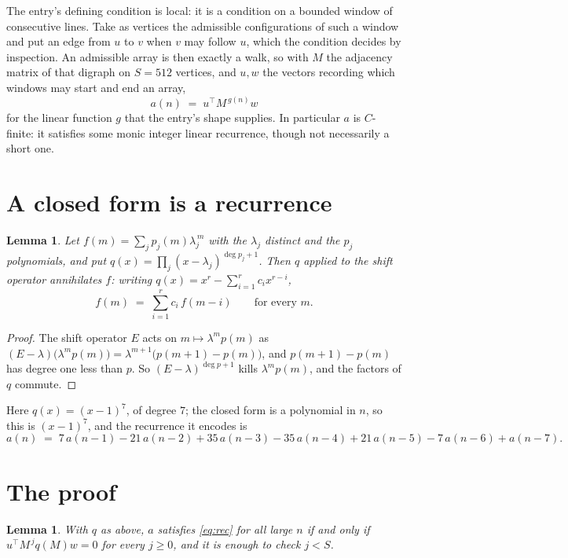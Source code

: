\documentclass[11pt,a4paper]{article}
\theoremstyle{plain}
\newtheorem{lemma}[theorem]{Lemma}
\theoremstyle{definition}
\begin{document}
The entry's defining condition is local: it is a condition on a bounded window of consecutive lines. Take as vertices the
admissible configurations of such a window and put an edge from $u$ to $v$ when $v$ may
follow $u$, which the condition decides by inspection. An admissible array is then exactly a
walk, so with $M$ the adjacency matrix of that digraph on $S=512$ vertices, and $u,w$ the
vectors recording which windows may start and end an array,
\[
a(n)\;=\;u^{\!\top}M^{\,g(n)}w
\]
for the linear function $g$ that the entry's shape supplies. In particular $a$ is
$C$-finite: it satisfies some monic integer linear recurrence, though not necessarily a short
one.

\section{A closed form is a recurrence}

\begin{lemma}\label{lem:ann}
Let $f(m)=\sum_{j}p_j(m)\lambda_j^{\,m}$ with the $\lambda_j$ distinct and the $p_j$
polynomials, and put $q(x)=\prod_j(x-\lambda_j)^{\deg p_j+1}$. Then $q$ applied to the shift
operator annihilates $f$: writing $q(x)=x^{r}-\sum_{i=1}^{r}c_ix^{r-i}$,
\[
f(m)\;=\;\sum_{i=1}^{r}c_i\,f(m-i)\qquad\text{for every }m.
\]
\end{lemma}

\begin{proof}
The shift operator $E$ acts on $m\mapsto\lambda^{m}p(m)$ as
$(E-\lambda)\bigl(\lambda^{m}p(m)\bigr)=\lambda^{m+1}\bigl(p(m+1)-p(m)\bigr)$, and
$p(m+1)-p(m)$ has degree one less than $p$. So $(E-\lambda)^{\deg p+1}$ kills
$\lambda^{m}p(m)$, and the factors of $q$ commute.
\end{proof}

Here $q(x)=(x-1)^{7}$, of degree $7$; the closed form is a polynomial in $n$, so this is $(x-1)^{7}$, and the recurrence it encodes is
\begin{equation}\label{eq:rec}
a(n)\;=\;7\,a(n-1) - 21\,a(n-2) + 35\,a(n-3) - 35\,a(n-4) + 21\,a(n-5) - 7\,a(n-6) + a(n-7).
\end{equation}

\section{The proof}

\begin{lemma}\label{lem:crit}
With $q$ as above, $a$ satisfies \eqref{eq:rec} for all large $n$ if and only if
$u^{\!\top}M^{\,j}q(M)w=0$ for every $j\ge0$, and it is enough to check $j<S$.
\end{lemma}
\end{document}
